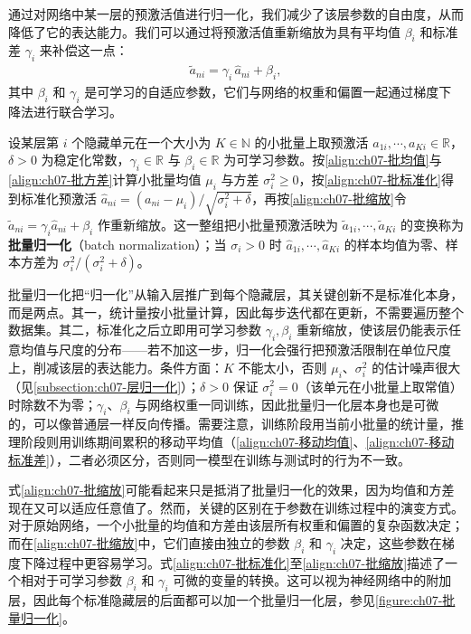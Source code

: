 \documentclass[../../main.tex]{subfiles}
\begin{document}
通过对网络中某一层的预激活值进行归一化，我们减少了该层参数的自由度，从而降低了它的表达能力。我们可以通过将预激活值重新缩放为具有平均值 $\beta_i$ 和标准差 $\gamma_i$ 来补偿这一点：
\begin{align}
\tilde{a}_{ni} = \gamma_i\,\hat{a}_{ni}+\beta_i,
\label{align:ch07-批缩放}
\end{align}
其中 $\beta_i$ 和 $\gamma_i$ 是可学习的自适应参数，它们与网络的权重和偏置一起通过梯度下降法进行联合学习。

\begin{definition}[批量归一化]\label{definition:ch07-批量归一化}
设某层第 $i$ 个隐藏单元在一个大小为 $K\in\mathbb{N}$ 的小批量上取预激活 $a_{1i},\cdots,a_{Ki}\in\mathbb{R}$，$\delta>0$ 为稳定化常数，$\gamma_{i}\in\mathbb{R}$ 与 $\beta_{i}\in\mathbb{R}$ 为可学习参数。按\eqref{align:ch07-批均值}与\eqref{align:ch07-批方差}计算小批量均值 $\mu_{i}$ 与方差 $\sigma_{i}^{2}\geqslant0$，按\eqref{align:ch07-批标准化}得到标准化预激活 $\hat{a}_{ni}=(a_{ni}-\mu_{i})/\sqrt{\sigma_{i}^{2}+\delta}$，再按\eqref{align:ch07-批缩放}令 $\tilde{a}_{ni}=\gamma_{i}\hat{a}_{ni}+\beta_{i}$ 作重新缩放。这一整组把小批量预激活映为 $\tilde{a}_{1i},\cdots,\tilde{a}_{Ki}$ 的变换称为\textbf{批量归一化}（batch normalization）；当 $\sigma_{i}>0$ 时 $\hat{a}_{1i},\cdots,\hat{a}_{Ki}$ 的样本均值为零、样本方差为 $\sigma_{i}^{2}/(\sigma_{i}^{2}+\delta)$。
\end{definition}

\begin{remark}
批量归一化把“归一化”从输入层推广到每个隐藏层，其关键创新不是标准化本身，而是两点。其一，统计量按小批量计算，因此每步迭代都在更新，不需要遍历整个数据集。其二，标准化之后立即用可学习参数 $\gamma_i,\beta_i$ 重新缩放，使该层仍能表示任意均值与尺度的分布——若不加这一步，归一化会强行把预激活限制在单位尺度上，削减该层的表达能力。条件方面：$K$ 不能太小，否则 $\mu_i$、$\sigma_i^{2}$ 的估计噪声很大（见\cref{subsection:ch07-层归一化}）；$\delta>0$ 保证 $\sigma_i^{2}=0$（该单元在小批量上取常值）时除数不为零；$\gamma_i$、$\beta_i$ 与网络权重一同训练，因此批量归一化层本身也是可微的，可以像普通层一样反向传播。需要注意，训练阶段用当前小批量的统计量，推理阶段则用训练期间累积的移动平均值（\eqref{align:ch07-移动均值}、\eqref{align:ch07-移动标准差}），二者必须区分，否则同一模型在训练与测试时的行为不一致。
\end{remark}

式\eqref{align:ch07-批缩放}可能看起来只是抵消了批量归一化的效果，因为均值和方差现在又可以适应任意值了。然而，关键的区别在于参数在训练过程中的演变方式。对于原始网络，一个小批量的均值和方差由该层所有权重和偏置的复杂函数决定；而在\eqref{align:ch07-批缩放}中，它们直接由独立的参数 $\beta_i$ 和 $\gamma_i$ 决定，这些参数在梯度下降过程中更容易学习。式\eqref{align:ch07-批标准化}至\eqref{align:ch07-批缩放}描述了一个相对于可学习参数 $\beta_i$ 和 $\gamma_i$ 可微的变量的转换。这可以视为神经网络中的附加层，因此每个标准隐藏层的后面都可以加一个批量归一化层，参见\cref{figure:ch07-批量归一化}。
\end{document}
